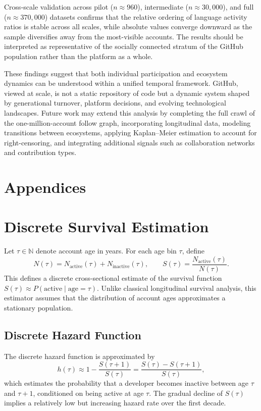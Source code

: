 \documentclass[12pt,a4paper]{article}
\begin{document}
Cross-scale validation across pilot ($n \approx 960$), intermediate ($n \approx 30{,}000$), and full ($n \approx 370{,}000$) datasets confirms that the relative ordering of language activity ratios is stable across all scales, while absolute values converge downward as the sample diversifies away from the most-visible accounts. The results should be interpreted as representative of the socially connected stratum of the GitHub population rather than the platform as a whole.

These findings suggest that both individual participation and ecosystem dynamics can be understood within a unified temporal framework. GitHub, viewed at scale, is not a static repository of code but a dynamic system shaped by generational turnover, platform decisions, and evolving technological landscapes. Future work may extend this analysis by completing the full crawl of the one-million-account follow graph, incorporating longitudinal data, modeling transitions between ecosystems, applying Kaplan--Meier estimation to account for right-censoring, and integrating additional signals such as collaboration networks and contribution types.
\newpage
\section*{Appendices}

\appendix

\section{Discrete Survival Estimation}

Let $\tau \in \mathbb{N}$ denote account age in years. For each age bin $\tau$, define
\[
N(\tau) = N_{\text{active}}(\tau) + N_{\text{inactive}}(\tau),
\qquad
S(\tau) = \frac{N_{\text{active}}(\tau)}{N(\tau)}.
\]
This defines a discrete cross-sectional estimate of the survival function $S(\tau) \approx P(\text{active} \mid \text{age} = \tau)$. Unlike classical longitudinal survival analysis, this estimator assumes that the distribution of account ages approximates a stationary population.

\subsection{Discrete Hazard Function}

The discrete hazard function is approximated by
\[
h(\tau) \approx 1 - \frac{S(\tau+1)}{S(\tau)} = \frac{S(\tau) - S(\tau+1)}{S(\tau)},
\]
which estimates the probability that a developer becomes inactive between age $\tau$ and $\tau+1$, conditioned on being active at age $\tau$. The gradual decline of $S(\tau)$ implies a relatively low but increasing hazard rate over the first decade.
\end{document}
